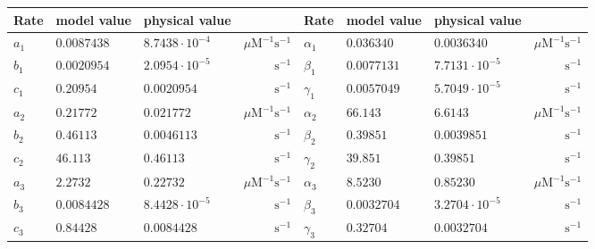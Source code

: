 \begin{tabular}{lllr@{\qquad}lllr}
\toprule
Rate & model value & physical value & & Rate & model value & physical value &\\
\midrule
$a_1$ & $0.0087438$ & $8.7438\cdot10^{-4}$ & $\mu\mathrm{M}^{-1}\mathrm{s}^{-1}$ & $\alpha_1$ & $0.036340$ & $0.0036340$ & $\mu\mathrm{M}^{-1}\mathrm{s}^{-1}$\\
$b_1$ & $0.0020954$ & $2.0954\cdot10^{-5}$ & $\mathrm{s}^{-1}$ & $\beta_1$ & $0.0077131$ & $7.7131\cdot10^{-5}$ & $\mathrm{s}^{-1}$\\
$c_1$ & $0.20954$ & $0.0020954$ & $\mathrm{s}^{-1}$ & $\gamma_1$ & $0.0057049$ & $5.7049\cdot10^{-5}$ & $\mathrm{s}^{-1}$\\
$a_2$ & $0.21772$ & $0.021772$ & $\mu\mathrm{M}^{-1}\mathrm{s}^{-1}$ & $\alpha_2$ & $66.143$ & $6.6143$ & $\mu\mathrm{M}^{-1}\mathrm{s}^{-1}$\\
$b_2$ & $0.46113$ & $0.0046113$ & $\mathrm{s}^{-1}$ & $\beta_2$ & $0.39851$ & $0.0039851$ & $\mathrm{s}^{-1}$\\
$c_2$ & $46.113$ & $0.46113$ & $\mathrm{s}^{-1}$ & $\gamma_2$ & $39.851$ & $0.39851$ & $\mathrm{s}^{-1}$\\
$a_3$ & $2.2732$ & $0.22732$ & $\mu\mathrm{M}^{-1}\mathrm{s}^{-1}$ & $\alpha_3$ & $8.5230$ & $0.85230$ & $\mu\mathrm{M}^{-1}\mathrm{s}^{-1}$\\
$b_3$ & $0.0084428$ & $8.4428\cdot10^{-5}$ & $\mathrm{s}^{-1}$ & $\beta_3$ & $0.0032704$ & $3.2704\cdot10^{-5}$ & $\mathrm{s}^{-1}$\\
$c_3$ & $0.84428$ & $0.0084428$ & $\mathrm{s}^{-1}$ & $\gamma_3$ & $0.32704$ & $0.0032704$ & $\mathrm{s}^{-1}$\\
\bottomrule
\end{tabular}
